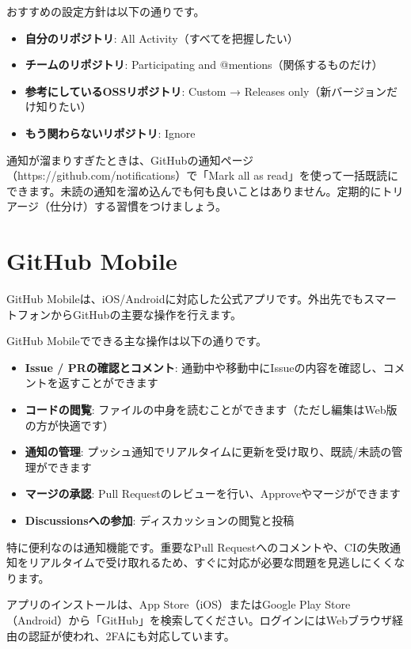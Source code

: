 おすすめの設定方針は以下の通りです。

\begin{itemize}
  \item \textbf{自分のリポジトリ}: All Activity（すべてを把握したい）
  \item \textbf{チームのリポジトリ}: Participating and @mentions（関係するものだけ）
  \item \textbf{参考にしているOSSリポジトリ}: Custom → Releases only（新バージョンだけ知りたい）
  \item \textbf{もう関わらないリポジトリ}: Ignore
\end{itemize}

通知が溜まりすぎたときは、GitHubの通知ページ（https://github.com/notifications）で「Mark all as read」を使って一括既読にできます。未読の通知を溜め込んでも何も良いことはありません。定期的にトリアージ（仕分け）する習慣をつけましょう。

\section{GitHub Mobile}

GitHub Mobileは、iOS/Androidに対応した公式アプリです。外出先でもスマートフォンからGitHubの主要な操作を行えます。

GitHub Mobileでできる主な操作は以下の通りです。

\begin{itemize}
  \item \textbf{Issue / PRの確認とコメント}: 通勤中や移動中にIssueの内容を確認し、コメントを返すことができます
  \item \textbf{コードの閲覧}: ファイルの中身を読むことができます（ただし編集はWeb版の方が快適です）
  \item \textbf{通知の管理}: プッシュ通知でリアルタイムに更新を受け取り、既読/未読の管理ができます
  \item \textbf{マージの承認}: Pull Requestのレビューを行い、Approveやマージができます
  \item \textbf{Discussionsへの参加}: ディスカッションの閲覧と投稿
\end{itemize}

特に便利なのは通知機能です。重要なPull Requestへのコメントや、CIの失敗通知をリアルタイムで受け取れるため、すぐに対応が必要な問題を見逃しにくくなります。

アプリのインストールは、App Store（iOS）またはGoogle Play Store（Android）から「GitHub」を検索してください。ログインにはWebブラウザ経由の認証が使われ、2FAにも対応しています。

